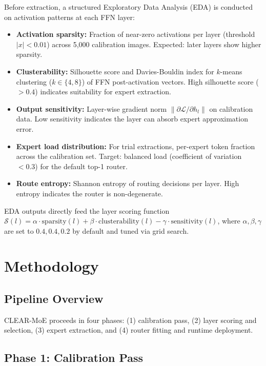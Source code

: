 \documentclass[conference]{IEEEtran}
\begin{document}
Before extraction, a structured Exploratory Data Analysis (EDA) is conducted on activation patterns at each FFN layer:

\begin{itemize}
    \item \textbf{Activation sparsity:} Fraction of near-zero activations per layer (threshold $|x| < 0.01$) across 5,000 calibration images. Expected: later layers show higher sparsity.
    \item \textbf{Clusterability:} Silhouette score and Davies-Bouldin index for $k$-means clustering ($k \in \{4, 8\}$) of FFN post-activation vectors. High silhouette score ($> 0.4$) indicates suitability for expert extraction.
    \item \textbf{Output sensitivity:} Layer-wise gradient norm $\|\partial \mathcal{L} / \partial h_l\|$ on calibration data. Low sensitivity indicates the layer can absorb expert approximation error.
    \item \textbf{Expert load distribution:} For trial extractions, per-expert token fraction across the calibration set. Target: balanced load (coefficient of variation $< 0.3$) for the default top-1 router.
    \item \textbf{Route entropy:} Shannon entropy of routing decisions per layer. High entropy indicates the router is non-degenerate.
\end{itemize}

EDA outputs directly feed the layer scoring function $\mathcal{S}(l) = \alpha \cdot \text{sparsity}(l) + \beta \cdot \text{clusterability}(l) - \gamma \cdot \text{sensitivity}(l)$, where $\alpha, \beta, \gamma$ are set to $0.4, 0.4, 0.2$ by default and tuned via grid search.

\section{Methodology}
\label{sec:method}

\subsection{Pipeline Overview}

CLEAR-MoE proceeds in four phases: (1) calibration pass, (2) layer scoring and selection, (3) expert extraction, and (4) router fitting and runtime deployment.

\subsection{Phase 1: Calibration Pass}
\end{document}
